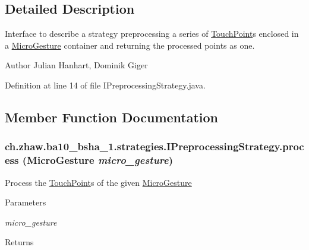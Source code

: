 \subsection{Detailed Description}
Interface to describe a strategy preprocessing a series of \hyperlink{classch_1_1zhaw_1_1ba10__bsha__1_1_1TouchPoint}{TouchPoint}s enclosed in a \hyperlink{}{MicroGesture} container and returning the processed points as one.

\begin{DoxyAuthor}{Author}
Julian Hanhart, Dominik Giger 
\end{DoxyAuthor}


Definition at line 14 of file IPreprocessingStrategy.java.

\subsection{Member Function Documentation}
\hypertarget{interfacech_1_1zhaw_1_1ba10__bsha__1_1_1strategies_1_1IPreprocessingStrategy_a3e3885dce8fda7b79dc514078f11ad62}{
\subsubsection[{process}]{ ch.zhaw.ba10\_\-bsha\_\-1.strategies.IPreprocessingStrategy.process ({\bf MicroGesture} {\em micro\_\-gesture})}}
\label{interfacech_1_1zhaw_1_1ba10__bsha__1_1_1strategies_1_1IPreprocessingStrategy_a3e3885dce8fda7b79dc514078f11ad62}
Process the \hyperlink{classch_1_1zhaw_1_1ba10__bsha__1_1_1TouchPoint}{TouchPoint}s of the given \hyperlink{}{MicroGesture}


\begin{DoxyParams}{Parameters}
\item[{\em micro\_\-gesture}]\end{DoxyParams}
\begin{DoxyReturn}{Returns}

\end{DoxyReturn}


